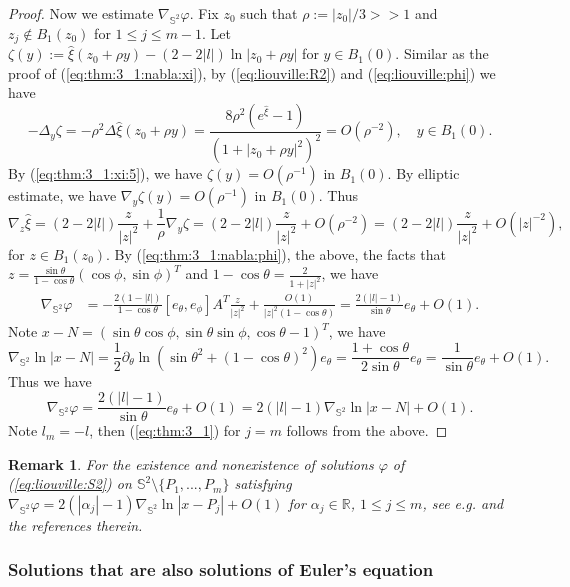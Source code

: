\documentclass[12pt]{article}
\newtheorem{rmk}{Remark}[section]
\newcommand{\R}{\mathbb{R}}
\newcommand{\bS}{\mathbb{S}}
\begin{document}
\begin{proof}
	Now we estimate $\nabla_{\bS^2}\varphi$. Fix $z_0$ such that $\rho:=|z_0|/3>>1$ and $z_j\notin B_1(z_0)$ for $1\le j\le m-1$. Let $\zeta(y):=\hat{\xi}(z_0+\rho y)-(2-2|l|)\ln |z_0+\rho y|$ for $y\in B_1(0)$. Similar as the proof of (\ref{eq:thm:3_1:nabla:xi}), by (\ref{eq:liouville:R2}) and (\ref{eq:liouville:phi}) we have 
	\[
		- \Delta_y\zeta 
		= - \rho^2\Delta\hat{\xi}(z_0+\rho y)=\frac{8\rho^2(e^{\hat{\xi}}-1)}{(1+|z_0+\rho y|^2)^2}=O(\rho^{-2}), \quad y\in B_1(0). 
	\]
	By (\ref{eq:thm:3_1:xi:5}), we have $\zeta(y)=O(\rho^{-1})$ in $B_1(0)$. By elliptic estimate, we have $\nabla_y\zeta(y)=O(\rho^{-1})$ in $B_1(0)$. Thus 
	\begin{equation*}
		\nabla_z\hat{\xi}=(2-2|l|) \frac{z}{|z|^2}+\frac{1}{\rho}\nabla_y\zeta=(2-2|l|) \frac{z}{|z|^2}+O(\rho^{-2})=(2-2|l|) \frac{z}{|z|^2}+O(|z|^{-2}), 
	\end{equation*}
	for $z\in B_1(z_0)$. By (\ref{eq:thm:3_1:nabla:phi}), the above, the facts that $z=\frac{\sin\theta}{1-\cos\theta}(\cos\phi, \sin\phi)^T$ and $1-\cos\theta=\frac{2}{1+|z|^2}$, we have 
	\[
	\begin{split}
		\nabla_{\bS^2}\varphi & 
		= - \frac{2(1-|l|)}{1-\cos\theta}[e_{\theta}, e_{\phi}] A^T \frac{z}{|z|^2}+\frac{O(1)}{|z|^2(1-\cos\theta)}=\frac{2(|l|-1)}{\sin\theta}e_{\theta}+O(1).
	\end{split}
	\]
	Note $x-N=(\sin\theta\cos\phi, \sin\theta\sin\phi, \cos\theta-1)^T$, we have 
	\[
		\nabla_{\bS^2}\ln |x-N|=\frac{1}{2}\partial_{\theta}\ln (\sin\theta^2+(1-\cos\theta)^2)e_{\theta}=\frac{1+\cos\theta}{2\sin\theta}e_{\theta}=\frac{1}{\sin\theta}e_{\theta}+O(1).
	\]
	Thus we have 
	\[
		\nabla_{\bS^2}\varphi=\frac{2(|l|-1)}{\sin\theta}e_{\theta}+O(1)=2(|l|-1)\nabla_{\bS^2}\ln |x-N|+O(1). 
	\]
	Note $l_{m}=-l$, then (\ref{eq:thm:3_1}) for $j=m$ follows from the above. 
\end{proof}

\begin{rmk}
	For the existence and nonexistence of solutions $\varphi$ of (\ref{eq:liouville:S2}) on $\bS^2\setminus\{P_1, ..., P_m\}$ satisfying $\nabla_{\bS^2}\varphi=2(|\alpha_j|-1)\nabla_{\bS^2} \ln |x-P_j|+O(1)$ for $\alpha_j\in \R$, $1\le j\le m$, see e.g. \cite{BMM, BT, LuoTian, MZ, MP1, MP2, Troyanov} and the references therein. 
\end{rmk}

\subsubsection{Solutions that are also solutions of Euler's equation}
\end{document}
